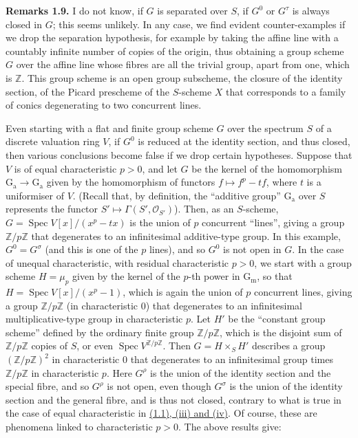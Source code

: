 \documentclass{article}
\newenvironment{rmenv}[1]
  {\phantomsection\par\smallskip\noindent\textbf{#1.}\rmfamily}
  {\par\smallskip}
\newcommand{\oldpage}[1]{\marginpar{\footnotesize$\Big\vert$ \textit{p.~#1}}}
\theoremstyle{definition}
\theoremstyle{definition}
\theoremstyle{definition}
\theoremstyle{definition}
\theoremstyle{remark}
\begin{document}
\leavevmode{}%
\begin{rmenv}{Remarks 1.9}
I do not know, if \(G\) is separated over \(S\), if \(G^0\) or \(G^\tau\) is always closed in \(G\);
this seems unlikely.
In any case, we find evident counter-examples if we drop the separation hypothesis, for example by taking the affine line with a countably infinite number of copies of the origin, thus obtaining a group scheme \(G\) over the affine line whose fibres are all the trivial group, apart from one, which is \(\mathbb{Z}\).
This group scheme is an open group subscheme, the closure of the identity section, of the Picard prescheme of the \(S\)-scheme \(X\) that corresponds to a family of conics degenerating to two concurrent lines.

Even starting with a flat and finite group scheme \(G\) over the spectrum \(S\) of a discrete valuation ring \(V\), if \(G^0\) is reduced at the identity section, and thus closed, then various conclusions become false if we drop certain hypotheses.
Suppose that \(V\) is of equal characteristic \(p>0\), and let \(G\) be the kernel of the homomorphism \(\operatorname{G_a}\to\operatorname{G_a}\) given by the homomorphism of functors \(f\mapsto f^p-tf\), where \(t\) is a uniformiser of \(V\).
\oldpage{236-10}(Recall that, by definition, the ``additive group'' \(\operatorname{G_a}\) over \(S\) represents the functor \(S'\mapsto\Gamma(S',{\mathscr{O}}_{S'})\)).
Then, as an \(S\)-scheme, \(G=\operatorname{Spec}V[x]/(x^p-tx)\) is the union of \(p\) concurrent ``lines'', giving a group \(\mathbb{Z}/p\mathbb{Z}\) that degenerates to an infinitesimal additive-type group.
In this example, \(G^0=G^\sigma\) (and this is one of the \(p\) lines), and so \(G^0\) is not open in \(G\).
In the case of unequal characteristic, with residual characteristic \(p>0\), we start with a group scheme \(H=\mu_p\) given by the kernel of the \(p\)-th power in \(\operatorname{G_m}\), so that \(H=\operatorname{Spec}V[x]/(x^p-1)\), which is again the union of \(p\) concurrent lines, giving a group \(\mathbb{Z}/p\mathbb{Z}\) (in characteristic \(0\)) that degenerates to an infinitesimal multiplicative-type group in characteristic \(p\).
Let \(H'\) be the ``constant group scheme'' defined by the ordinary finite group \(\mathbb{Z}/p\mathbb{Z}\), which is the disjoint sum of \(\mathbb{Z}/p\mathbb{Z}\) copies of \(S\), or even \(\operatorname{Spec}V^{\mathbb{Z}/p\mathbb{Z}}\).
Then \(G=H\times_S H'\) describes a group \((\mathbb{Z}/p\mathbb{Z})^2\) in characteristic \(0\) that degenerates to an infinitesimal group times \(\mathbb{Z}/p\mathbb{Z}\) in characteristic \(p\).
Here \(G^\rho\) is the union of the identity section and the special fibre, and so \(G^\rho\) is not open, even though \(G^\sigma\) is the union of the identity section and the general fibre, and is thus not closed, contrary to what is true in the case of equal characteristic in \protect\hyperlink{fga-3-vi-theorem-1.1}{(1.1), (iii) and (iv)}.
Of course, these are phenomena linked to characteristic \(p>0\).
The above results give:

\end{rmenv}
\end{document}
